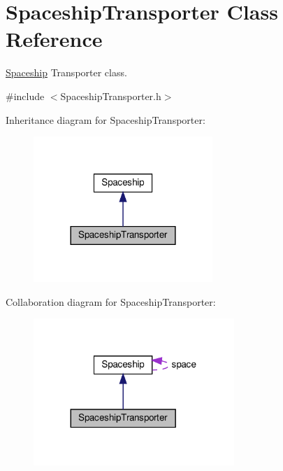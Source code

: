 \hypertarget{classSpaceshipTransporter}{}\section{Spaceship\+Transporter Class Reference}
\label{classSpaceshipTransporter}


\hyperlink{classSpaceship}{Spaceship} Transporter class.  




{\ttfamily \#include $<$Spaceship\+Transporter.\+h$>$}



Inheritance diagram for Spaceship\+Transporter\+:\nopagebreak
\begin{figure}[H]
\begin{center}
\leavevmode
\includegraphics[width=192pt]{classSpaceshipTransporter__inherit__graph}
\end{center}
\end{figure}


Collaboration diagram for Spaceship\+Transporter\+:\nopagebreak
\begin{figure}[H]
\begin{center}
\leavevmode
\includegraphics[width=215pt]{classSpaceshipTransporter__coll__graph}
\end{center}
\end{figure}
